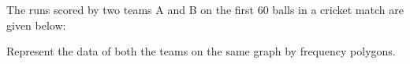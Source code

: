  The runs scored by two teams A and B on
the first 60 balls in a cricket match are given
below:
\begin{table}[!ht]
\centering

\label{table:Q43}	
\end{table}
Represent the data of both the teams on the
same graph by frequency polygons.
